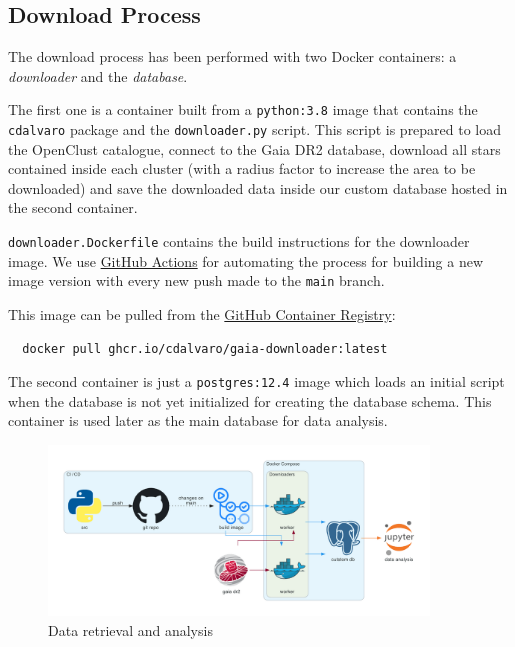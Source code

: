 \documentclass[11pt, a4paper, english]{book}
\begin{document}
\subsection{Download Process}

The download process has been performed with two Docker containers: a \emph{downloader} and the \emph{database}.

The first one is a container built from a \verb|python:3.8| image that contains the \verb|cdalvaro| package
and the \verb|downloader.py| script.
This script is prepared to load the OpenClust catalogue, connect to the Gaia DR2 database,
download all stars contained inside each cluster (with a radius factor to increase the area to be downloaded)
and save the downloaded data inside our custom database hosted in the second container.

\verb|downloader.Dockerfile| contains the build instructions for the downloader image.
We use \href{https://github.com/features/actions}{GitHub Actions} for automating the process
for building a new image version with every new push made to the \verb|main| branch.

This image can be pulled from the
\href{https://github.blog/2020-09-01-introducing-github-container-registry/}{GitHub Container Registry}:

\begin{verbatim}
  docker pull ghcr.io/cdalvaro/gaia-downloader:latest
\end{verbatim}

The second container is just a \verb|postgres:12.4| image which loads an initial script when
the database is not yet initialized for creating the database schema.
This container is used later as the main database for data analysis.

\begin{figure}[htbp]
  \centering
  \includegraphics[width=0.9\textwidth]{../figures/services_diagram.pdf}
  \caption{Data retrieval and analysis}
  \label{fig:services_diagram}
\end{figure}
\end{document}
